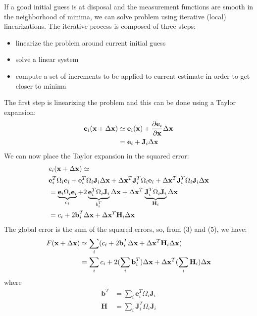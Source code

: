 \documentclass[a4paper, onecolumn]{report}
\begin{document}
If a good initial guess is at disposal and the measurement functions are smooth in the neighborhood of minima, we can solve problem using iterative (local) linearizations. The iterative process is composed of three steps:
\begin{itemize}
	\item{linearize the problem around current initial guess}
	\item{solve a linear system}
	\item{compute a set of increments to be applied to current estimate in order to get closer to minima}
\end{itemize}
The first step is linearizing the problem and this can be done using a Taylor expansion:
\begin{align}
	\textbf{e}_i(\textbf{x} + \Delta\textbf{x}) &\simeq \textbf{e}_i(\textbf{x}) + \frac{\partial \textbf{e}_i}{\partial \textbf{x}}\Delta\textbf{x}\\
	&= \textbf{e}_i + \textbf{J}_i\Delta\textbf{x} \notag
\end{align}
We can now place the Taylor expansion in the squared error:
\begin{align}
	&e_i(\textbf{x} + \Delta\textbf{x}) \simeq \notag \\
	&\textbf{e}_i^T\Omega_i\textbf{e}_i + \textbf{e}_i^T\Omega_i\textbf{J}_i\Delta\textbf{x} + \Delta\textbf{x}^T\textbf{J}_i^T\Omega_i\textbf{e}_i + \Delta\textbf{x}^T\textbf{J}^T_i\Omega_i\textbf{J}_i\Delta\textbf{x} \notag \\
	&= \underbrace{\textbf{e}_i\Omega_i\textbf{e}_i}_\text{$c_i$} + 2\underbrace{\textbf{e}_i^T\Omega_i\textbf{J}_i}_\text{$b_i^T$}\Delta\textbf{x} + \Delta\textbf{x}^T\underbrace{\textbf{J}_i^T\Omega_i\textbf{J}_i}_\text{$\textbf{H}_i$}\Delta\textbf{x} \notag \\
	&= c_i + 2\textbf{b}_i^T\Delta\textbf{x} + \Delta\textbf{x}^T\textbf{H}_i\Delta\textbf{x}
\end{align}
The global error is the sum of the squared errors, so, from (3) and (5), we have:
\begin{align}
	F(\textbf{x} + \Delta\textbf{x}) &\simeq \sum_i(c_i + 2\textbf{b}_i^T\Delta\textbf{x} + \Delta\textbf{x}^T\textbf{H}_i\Delta\textbf{x}) \notag \\
	&= \sum_i c_i + 2(\sum_i\textbf{b}_i^T)\Delta\textbf{x} + \Delta\textbf{x}^T(\sum_i\textbf{H}_i)\Delta\textbf{x}
\end{align}
where
\begin{align}
	\textbf{b}^T &= \sum_i\textbf{e}_i^T\Omega_i\textbf{J}_i  \\
	\textbf{H} &= \sum_i\textbf{J}_i^T\Omega_i\textbf{J}_i 
\end{align}
\end{document}
